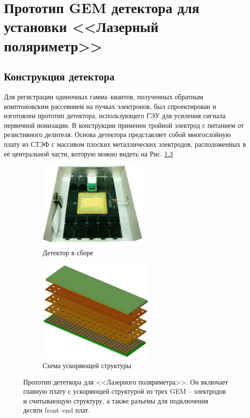 \chapter{Прототип GEM детектора для установки <<Лазерный поляриметр>>}
\label{sec:pol_examine}
\section{Конструкция детектора}
Для регистрации одиночных гамма--квантов, полученных обратным комптоновским рассеянием на пучках электронов, был спроектирован и изготовлен прототип детектора, использующего ГЭУ для усиления сигнала первичной ионизации. В конструкции применен тройной электрод с питанием от резистивного делителя. Основа детектора представляет собой многослойную плату из СТЭФ с массивом плоских металлических электродов, расположенных в её центральной части, которую можно видеть на Рис. \ref{fig:Detector_full_fig} 
\begin{figure}[H]
	\centering
	\begin{subfigure}{.5\textwidth}
		\centering
		\includegraphics[height = 5 cm, width= 5.5cm]{img/GEM_prototype.jpg}
		\caption{Детектор в сборе}
		\label{fig:Detector}
	\end{subfigure}%
	\begin{subfigure}{.5\textwidth}
		\centering
		\includegraphics[height = 5 cm, width= 5.8cm]{img/GEM_model.pdf}
		\caption{Схема ускоряющей структуры}
		\label{fig:GEM_structure}
	\end{subfigure}
	\caption{Прототип дететкора для <<Лазерного поляриметра>>. Он включает главную плату с ускоряющей структурой из трех GEM -- электродов и считывающую структуру, а также разъемы для подключения десяти front--end плат.}
	\label{fig:Detector_full_fig}
\end{figure}
